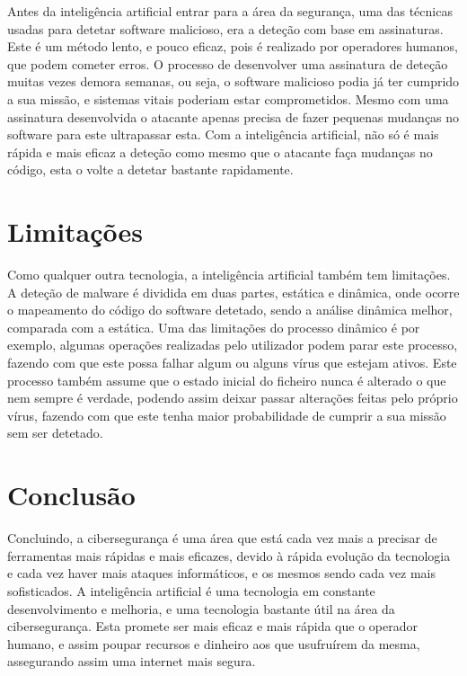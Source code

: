 \documentclass[10pt]{article}
\begin{document}
Antes da inteligência artificial entrar para a área da segurança, uma das técnicas usadas para detetar software malicioso, era a deteção com base em assinaturas. Este é um método lento, e pouco eficaz, pois é realizado por operadores humanos, que podem cometer erros. O processo de desenvolver uma assinatura de deteção muitas vezes demora semanas, ou seja, o software malicioso podia já ter cumprido a sua missão, e sistemas vitais poderiam estar comprometidos. Mesmo com uma assinatura desenvolvida o atacante apenas precisa de fazer pequenas mudanças no software para este ultrapassar esta. Com a inteligência artificial, não só é mais rápida e mais eficaz a deteção como mesmo que o atacante faça mudanças no código, esta o volte a detetar bastante rapidamente.


\section{Limitações}

Como qualquer outra tecnologia, a inteligência artificial também tem limitações. A deteção de malware é dividida em duas partes, estática e dinâmica, onde ocorre o mapeamento do código do software detetado, sendo a análise dinâmica melhor, comparada com a estática. Uma das limitações do processo dinâmico é por exemplo, algumas operações realizadas pelo utilizador podem parar este processo, fazendo com que este possa falhar algum ou alguns vírus que estejam ativos. Este processo também assume que o estado inicial do ficheiro nunca é alterado o que nem sempre é verdade, podendo assim deixar passar alterações feitas pelo próprio vírus, fazendo com que este tenha maior probabilidade de cumprir a sua missão sem ser detetado.


\section{Conclusão}

Concluindo, a cibersegurança é uma área que está cada vez mais a precisar de ferramentas mais rápidas e mais eficazes, devido à rápida evolução da tecnologia e cada vez haver mais ataques informáticos, e os mesmos sendo cada vez mais sofisticados. A inteligência artificial é uma tecnologia em constante desenvolvimento e melhoria, e uma tecnologia bastante útil na área da cibersegurança. Esta promete ser mais eficaz e mais rápida que o operador humano, e assim poupar recursos e dinheiro aos que usufruírem da mesma, assegurando assim uma internet mais segura.


\nocite{faruk2021malware}
\nocite{libri2020paella}
\nocite{huang2020research}
\nocite{majid2021review}
\nocite{gupta2020ai}
\nocite{abdelsalam2021artificial}
\nocite{alkahtani2022artificial}
\nocite{ferdaos2020smart}
\nocite{poudyal2020ai}
\nocite{vinayakumar2019robust}
\nocite{saad2019curious}
\nocite{scott2017signature}




\end{document}
